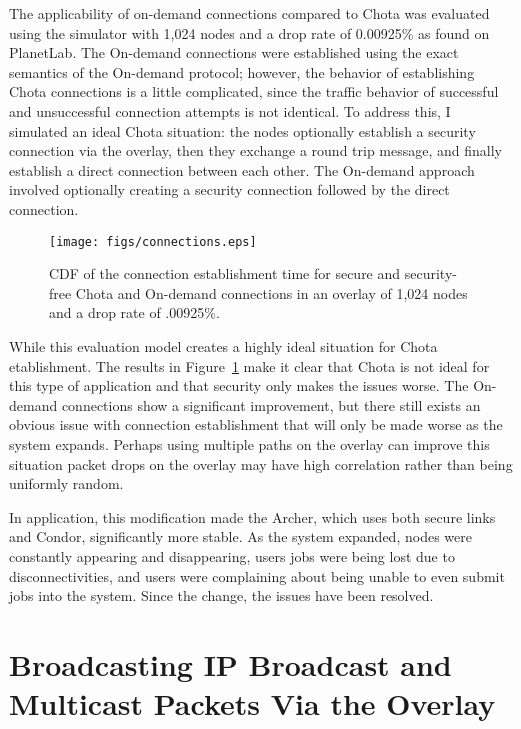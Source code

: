 The applicability of on-demand connections compared to Chota was evaluated
using the simulator with 1,024 nodes and a drop rate of 0.00925\% as found on
PlanetLab.  The On-demand connections were established using the exact semantics
of the On-demand protocol; however, the behavior of establishing Chota
connections is a little complicated, since the traffic behavior of successful
and unsuccessful connection attempts is not identical.  To address this, I
simulated an ideal Chota situation:  the nodes optionally establish a security
connection via the overlay, then they exchange a round trip message, and
finally establish a direct connection between each other.  The On-demand
approach involved optionally creating a security connection followed by the
direct connection.  

\begin{figure}[ht]
\centering
\texttt{[image: figs/connections.eps]}
\caption[Time to form a direct connection]{CDF of the connection establishment
time for secure and security-free Chota and On-demand connections in an overlay
of 1,024 nodes and a drop rate of .00925\%.}
\label{fig:connections}
\end{figure}

While this evaluation model creates a highly ideal situation for Chota
etablishment.  The results in Figure~\ref{fig:connections} make it clear that
Chota is not ideal for this type of application and that security only makes
the issues worse.  The On-demand connections show a significant improvement, but
there still exists an obvious issue with connection establishment that will
only be made worse as the system expands.  Perhaps using multiple paths on the
overlay can improve this situation packet drops on the overlay may have high
correlation rather than being uniformly random.

In application, this modification made the Archer, which uses both secure links
and Condor, significantly more stable.  As the system expanded, nodes were
constantly appearing and disappearing, users jobs were being lost due to
disconnectivities, and users were complaining about being unable to even submit
jobs into the system.  Since the change, the issues have been resolved.

\section{Broadcasting IP Broadcast and Multicast Packets Via the Overlay}

